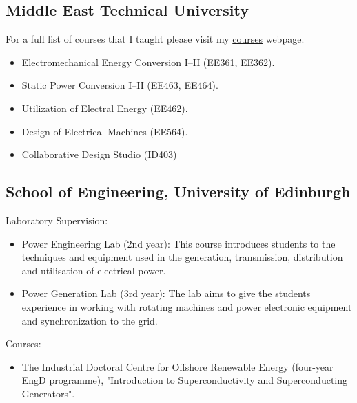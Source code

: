 \documentclass[a4paper,12pt]{article}
\begin{document}
\subsection{Middle East Technical University}

For a full list of courses that I taught please visit my \href{http://keysan.me/courses}{courses} webpage. 

\begin{itemize}
\item Electromechanical Energy Conversion I--II (EE361, EE362).
\item Static Power Conversion I--II (EE463, EE464).
\item Utilization of Electral Energy (EE462).
\item Design of Electrical Machines (EE564).
\item Collaborative Design Studio (ID403)
\end{itemize}


\subsection{School of Engineering, University of Edinburgh}

Laboratory Supervision:
\begin{itemize}
\item Power Engineering Lab (2nd year): This course introduces students to the techniques and equipment used in the generation, transmission, distribution and utilisation of electrical power.
\item Power Generation Lab (3rd year): The lab aims to give the students experience in working with rotating machines and power electronic equipment and synchronization to the grid. 

\end{itemize}

Courses:
\begin{itemize}
\item The Industrial Doctoral Centre for Offshore Renewable Energy (four-year EngD programme), "Introduction to Superconductivity and Superconducting Generators".
\end{itemize}
\end{document}
